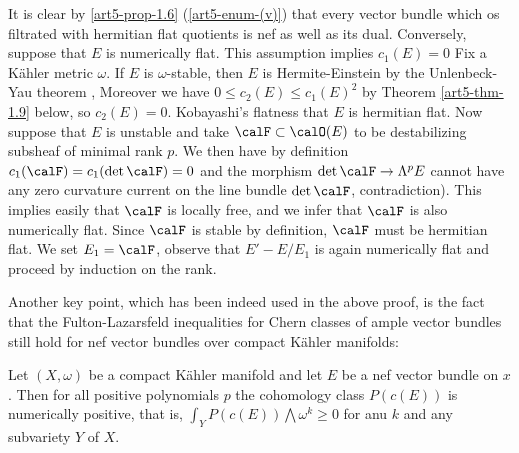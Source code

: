 \begin{sketch of proof}
It is clear by \ref{art5-prop-1.6} (\ref{art5-enum-(v)}) that every vector bundle which os filtrated with hermitian flat quotients is nef as well as its dual. Conversely, suppose that $E$ is numerically flat. This assumption implies \break $c_{1}(E) = 0$ Fix a K\"ahler metric $\omega$. If $E$ is $\omega$-stable, then $E$ is Hermite-Einstein by the Unlenbeck-Yau theorem \cite{art5-keyUY86}, Moreover we have $0 \leq c_{2}(E) \leq c_{1}(E)^{2}$ by Theorem \ref{art5-thm-1.9} below, so $c_{2}(E) = 0$. Kobayashi's flatness that $E$ is hermitian flat. Now suppose that $E$ is unstable and take $\calF \subset\calO(E)$ to be destabilizing subsheaf of minimal rank $p$. We then have by definition $c_{1}(\calF) = c_{1}(\det \calF) = 0$ and the morphism $\det\calF \rightarrow \Lambda^{p}E$ cannot have any zero curvature current on the line bundle $\det \calF$, contradiction). This implies easily that $\calF$ is locally free, and we infer that $\calF$ is also numerically flat. Since $\calF$ is stable by definition, $\calF$ must be hermitian flat. We set $E_{1} = \calF$, observe that $E' - E/E_{1}$ is again numerically flat and proceed by induction on the rank.
\end{sketch of proof}

Another key point, which has been indeed used in the above proof, is the fact that the Fulton-Lazarsfeld inequalities \cite{art5-keyFL83} for Chern classes of ample vector bundles still hold for nef vector bundles over compact K\"ahler manifolds:

\begin{theorem}\label{art5-thm-1.9}
Let $(X, \omega)$ be a compact K\"ahler manifold and let $E$ be a nef vector bundle on $x$. Then for all positive polynomials $p$ the cohomology class $P(c(E))$ is numerically positive, that is, $\int_{Y}P(c(E)) \bigwedge \omega^{k} \geq 0$ for anu $k$ and any subvariety $Y$ of $X$.
\end{theorem}

